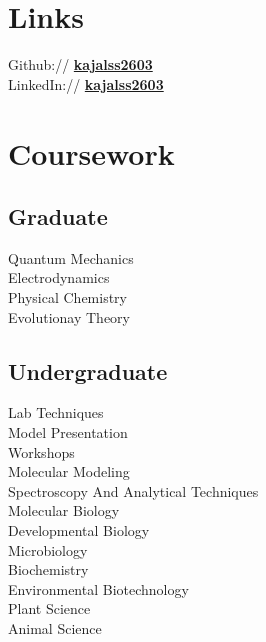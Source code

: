 \documentclass[]{dhirendra-pratap-singh-resume}
\begin{document}
\begin{minipage}[t]{0.33\textwidth}

\section{Links} 
Github:// \href{https://github.com/kajalss2603}{\bf kajalss2603} \\
LinkedIn:// \href{https://www.linkedin.com/in/kajalss2603}{\bf kajalss2603} \\
\sectionsep


\section{Coursework}

\subsection{Graduate}
Quantum Mechanics \\
Electrodynamics\\
Physical Chemistry  \\
Evolutionay Theory \\
\subsection{}
\subsection{Undergraduate} 
Lab Techniques \\
Model Presentation \\
Workshops \\
Molecular Modeling\\
Spectroscopy And Analytical Techniques \\
Molecular Biology \\
Developmental Biology \\
Microbiology \\
Biochemistry \\
Environmental Biotechnology \\
Plant Science \\
Animal Science \\


\sectionsep

%
%

\end{minipage}
\end{document}
